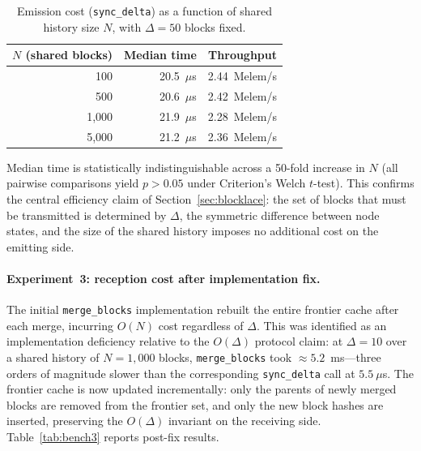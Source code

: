 \documentclass[12pt]{article}
\begin{document}
	\begin{table}[h]
		\centering
		\caption{Emission cost (\texttt{sync\_delta}) as a function of
			shared history size $N$, with $\Delta = 50$ blocks fixed.}
		\label{tab:bench2}
		\small
		\begin{tabular}{@{} r r r @{}}
			\toprule
			$N$ (shared blocks) & Median time & Throughput \\
			\midrule
			100   & 20.5~$\mu$s & 2.44~Melem/s \\
			500   & 20.6~$\mu$s & 2.42~Melem/s \\
			1{,}000 & 21.9~$\mu$s & 2.28~Melem/s \\
			5{,}000 & 21.2~$\mu$s & 2.36~Melem/s \\
			\bottomrule
		\end{tabular}
	\end{table}
	
	Median time is statistically indistinguishable across a 50-fold
	increase in $N$ (all pairwise comparisons yield $p > 0.05$ under
	Criterion's Welch $t$-test). This confirms the central efficiency
	claim of Section~\ref{sec:blocklace}: the set of blocks that must be
	transmitted is determined by $\Delta$, the symmetric difference
	between node states, and the size of the shared history imposes no
	additional cost on the emitting side.
	
	\paragraph{Experiment~3: reception cost after implementation fix.}
	
	The initial \texttt{merge\_blocks} implementation rebuilt the entire
	frontier cache after each merge, incurring $O(N)$ cost regardless of
	$\Delta$. This was identified as an implementation deficiency relative
	to the $O(\Delta)$ protocol claim: at $\Delta = 10$ over a shared
	history of $N = 1{,}000$ blocks, \texttt{merge\_blocks} took
	${\approx}5.2$~ms---three orders of magnitude slower than the
	corresponding \texttt{sync\_delta} call at $5.5~\mu$s. The frontier
	cache is now updated incrementally: only the parents of newly merged
	blocks are removed from the frontier set, and only the new block
	hashes are inserted, preserving the $O(\Delta)$ invariant on the
	receiving side. Table~\ref{tab:bench3} reports post-fix results.
	
\end{document}

